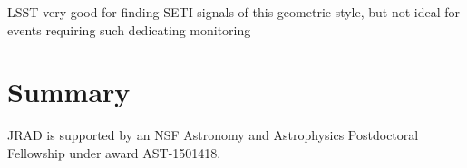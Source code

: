 \documentclass[]{openjournal}
\begin{document}
LSST very good for finding SETI signals of this geometric style, but not ideal for events requiring such dedicating monitoring


\section{Summary}



\acknowledgments
JRAD is supported by an NSF Astronomy and Astrophysics Postdoctoral Fellowship under award AST-1501418.


\end{document}
